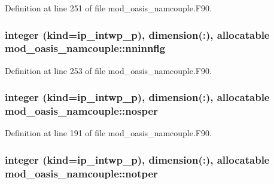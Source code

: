 Definition at line 251 of file mod\+\_\+oasis\+\_\+namcouple.\+F90.

\hypertarget{classmod__oasis__namcouple_a6526a92cd5fa662f9da229806d062dc2}{
\subsubsection[{nninnflg}]{\setlength{\rightskip}{0pt plus 5cm}integer (kind=ip\+\_\+intwp\+\_\+p), dimension(\+:), allocatable mod\+\_\+oasis\+\_\+namcouple\+::nninnflg\hspace{0.3cm}{\ttfamily [private]}}}\label{classmod__oasis__namcouple_a6526a92cd5fa662f9da229806d062dc2}


Definition at line 253 of file mod\+\_\+oasis\+\_\+namcouple.\+F90.

\hypertarget{classmod__oasis__namcouple_a484a71c213c89416924a0e23cfd46269}{
\subsubsection[{nosper}]{\setlength{\rightskip}{0pt plus 5cm}integer (kind=ip\+\_\+intwp\+\_\+p), dimension(\+:), allocatable mod\+\_\+oasis\+\_\+namcouple\+::nosper\hspace{0.3cm}{\ttfamily [private]}}}\label{classmod__oasis__namcouple_a484a71c213c89416924a0e23cfd46269}


Definition at line 191 of file mod\+\_\+oasis\+\_\+namcouple.\+F90.

\hypertarget{classmod__oasis__namcouple_ac154fc90756832bc90d02ea21f7c7e17}{
\subsubsection[{notper}]{\setlength{\rightskip}{0pt plus 5cm}integer (kind=ip\+\_\+intwp\+\_\+p), dimension(\+:), allocatable mod\+\_\+oasis\+\_\+namcouple\+::notper\hspace{0.3cm}{\ttfamily [private]}}}\label{classmod__oasis__namcouple_ac154fc90756832bc90d02ea21f7c7e17}



